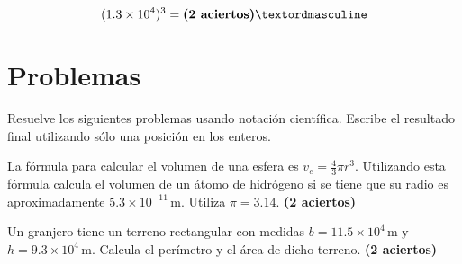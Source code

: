 \documentclass[11pt]{article}
\begin{document}
\vspace{2.5cm}
\begin{equation}
(1.3 \times 10^{4})^{3} = \hfill \textbf{(2 aciertos)}º
\end{equation}

\vspace{2.5cm}
\section*{Problemas} %
\label{sec:problemas}
Resuelve los siguientes problemas usando notaci\'on cient\'ifica. Escribe el
resultado final utilizando s\'olo una posici\'on en los enteros.

\vspace{3mm}
La f\'ormula para calcular el volumen de una esfera es $v_{e} = \frac{4}{3} \pi
r^{3}$. Utilizando esta f\'ormula calcula el volumen de un \'atomo de
hidr\'ogeno si se tiene que su radio es aproximadamente $5.3 \times
10^{-11}$\,m. Utiliza $\pi = 3.14$.  \hfill \textbf{(2 aciertos)}

\vspace{4cm}
Un granjero tiene un terreno rectangular con medidas $b=11.5 \times 10^{4}$\,m y
$h=9.3 \times 10^{4}$\,m. Calcula el per\'imetro y el \'area de dicho terreno. 
\hfill \textbf{(2 aciertos)} 

\end{document}

